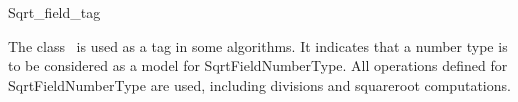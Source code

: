 \begin{ccRefClass} {Sqrt_field_tag}

\ccDefinition

The class \ccRefName\ is used as a tag in some algorithms. It
indicates that a number type is to be considered as a model for
SqrtFieldNumberType. All operations defined for SqrtFieldNumberType
are used, including divisions and squareroot computations.


\ccSeeAlso
{} \\
 \\
 \\

\end{ccRefClass} 
